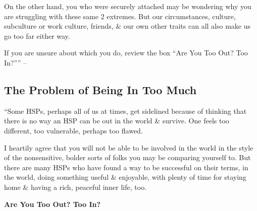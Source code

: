 \documentclass{article}
\numberwithin{equation}{section}
\begin{document}
On the other hand, you who were securely attached may be wondering why you are struggling with these same 2 extremes. But our circumstances, culture, subculture or work culture, friends, \& our own other traits can all also make us go too far either way.

If you are unsure about which you do, review the box ``Are You Too Out? Too In?'''' -- \cite[pp. 81--83]{Aron2013}

\subsection{The Problem of Being In Too Much}
``Some HSPs, perhaps all of us at times, get sidelined because of thinking that there is no way an HSP can be out in the world \& survive. One feels too different, too vulnerable, perhaps too flawed.

I heartily agree that you will not be able to be involved in the world in the style of the nonsensitive, bolder sorts of folks you may be comparing yourself to. But there are many HSPs who have found a way to be successful on their terms, in the world, doing something useful \& enjoyable, with plenty of time for staying home \& having a rich, peaceful inner life, too.

\noindent\textbf{Are You Too Out? Too In?}
\end{document}
